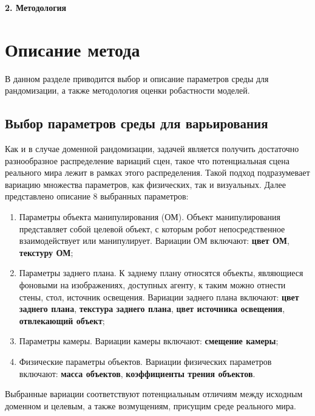 \newpage
\begin{center}
  \textbf{\large 2. Методология}
\end{center}
\label{method}

\section{Описание метода}
В данном разделе приводится выбор и описание параметров среды для рандомизации, а также методология оценки робастности моделей.

    \subsection{Выбор параметров среды для варьирования}

        Как и в случае доменной рандомизации, задачей является получить достаточно разнообразное распределение вариаций сцен, такое что потенциальная сцена реального мира лежит в рамках этого распределения. Такой подход подразумевает вариацию множества параметров, как физических, так и визуальных. Далее представлено описание 8 выбранных параметров:

        \begin{enumerate}
            \item Параметры объекта манипулирования (ОМ). Объект манипулирования представляет собой целевой объект, с которым робот непосредственное взаимодействует или манипулирует. Вариации ОМ включают: \textbf{цвет ОМ}, \textbf{текстуру ОМ};

            \item Параметры заднего плана. К заднему плану относятся объекты, являющиеся фоновыми на изображениях, доступных агенту, к таким можно отнести стены, стол, источник освещения. Вариации заднего плана включают: \textbf{цвет заднего плана}, \textbf{текстура заднего плана}, \textbf{цвет источника освещения}, \textbf{отвлекающий объект};

            \item Параметры камеры. Вариации камеры включают: \textbf{смещение камеры};

            \item Физические параметры объектов. Вариации физических параметров включают: \textbf{масса объектов}, \textbf{коэффициенты трения объектов}.
        \end{enumerate}

        Выбранные вариации соответствуют потенциальным отличиям между исходным доменном и целевым, а также возмущениям, присущим среде реального мира. 

